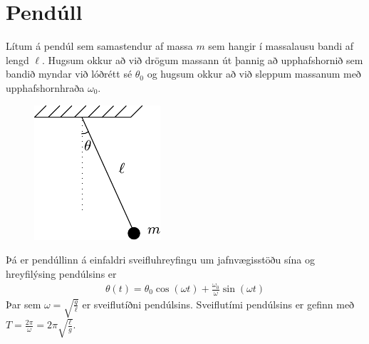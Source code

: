 \ifdefined \wholebook \else\documentclass[oneside]{book}\usepackage{EdlBook}\graphicspath{{figures/}}
\begin{document}
\section{Pendúll}

\begin{tcolorbox}
\begin{theorem} \label{law:pendulum}
Lítum á pendúl sem samastendur af massa $m$ sem hangir í massalausu bandi af lengd $\ell$. Hugsum okkur að við drögum massann út þannig að upphafshornið sem bandið myndar við lóðrétt sé $\theta_0$ og hugsum okkur að við sleppum massanum með upphafshornhraða $\omega_0$.
\begin{figure}[H]
    \centering
    \includegraphics{figures/pendulum.pdf}
\end{figure}
Þá er pendúllinn á einfaldri sveifluhreyfingu um jafnvægisstöðu sína og hreyfilýsing pendúlsins er
\begin{align*}
    \theta(t) = \theta_0 \cos(\omega t) + \frac{\omega_0}{\omega}\sin(\omega t)
\end{align*}
Þar sem $\omega = \sqrt{\frac{g}{\ell}}$ er sveiflutíðni pendúlsins. Sveiflutími pendúlsins er gefinn með $T = \frac{2\pi}{\omega} = 2\pi \sqrt{\frac{\ell}{g}}$.
\end{theorem}
\end{tcolorbox}
\end{document}
